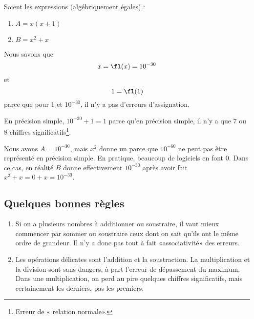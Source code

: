 \begin{example}
	Soient les expressions (algébriquement égales) :
	\begin{enumerate}
		\item
			\(A= x(x+1)\)
		\item
			\(B= x^2+x\)
	\end{enumerate}
	Nous savons que
	\begin{equation}
		x=\fl(x)=10^{-30}
	\end{equation}
	et
	\begin{equation}
		1=\fl(1)
	\end{equation}
	parce que pour \( 1\) et \( 10^{-30}\), il n'y a pas d'erreurs d'assignation.

	En précision simple, \( 10^{-30}+1=1\) parce qu'en précision simple, il n'y a que \( 7\) ou \( 8\) chiffres significatifs\footnote{Erreur de « relation normale».}.

	Nous avons $A=10^{-30}$, mais \( x^2\) donne un  parce que \( 10^{-60}\) ne peut pas être représenté en précision simple. En pratique, beaucoup de logiciels en font \( 0\). Dans ce cas, en réalité \( B\) donne effectivement \( 10^{-30}\) après avoir fait \( x^2+x=0+x=10^{-30}\).
\end{example}

\subsection{Quelques bonnes règles}

\begin{enumerate}
	\item
		Si on a plusieurs nombres à additionner ou soustraire, il vaut mieux commencer par sommer ou soustraire ceux dont on sait qu'ils ont le même ordre de grandeur. Il n'y a donc pas tout à fait «associativité» des erreurs.
	\item
		Les opérations délicates sont l'addition et la soustraction. La multiplication et la division sont sans dangers, à part l'erreur de dépassement du maximum. Dans une multiplication, on perd au pire quelques chiffres significatifs, mais certainement les derniers, pas les premiers.
\end{enumerate}

